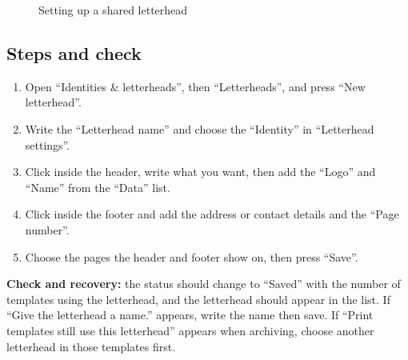 \begin{figure}[H]
\centering
{}
\rclegend
\caption{Setting up a shared letterhead}
\label{fig:builder-letterheads-flow}
\end{figure}

\subsection{Steps and check}
\begin{enumerate}
\item Open “Identities \& letterheads”, then “Letterheads”, and press “New letterhead”.
\item Write the “Letterhead name” and choose the “Identity” in “Letterhead settings”.
\item Click inside the header, write what you want, then add the “Logo” and “Name” from the “Data” list.
\item Click inside the footer and add the address or contact details and the “Page number”.
\item Choose the pages the header and footer show on, then press “Save”.
\end{enumerate}

\textbf{Check and recovery:} the status should change to “Saved” with the number of templates using the letterhead, and the letterhead should appear in the list. If “Give the letterhead a name.” appears, write the name then save. If “Print templates still use this letterhead” appears when archiving, choose another letterhead in those templates first.

